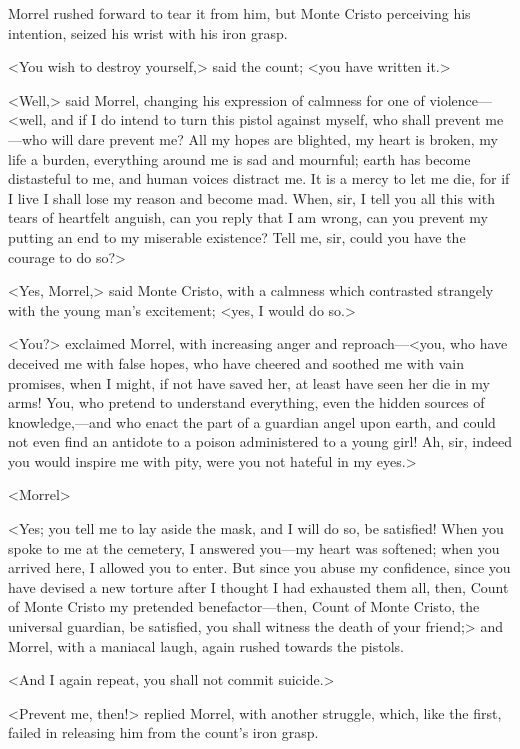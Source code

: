  Morrel rushed forward to tear it from him, but Monte Cristo perceiving his intention, seized his wrist with his iron grasp. 

 <You wish to destroy yourself,> said the count; <you have written it.> 

 <Well,> said Morrel, changing his expression of calmness for one of violence—<well, and if I do intend to turn this pistol against myself, who shall prevent me—who will dare prevent me? All my hopes are blighted, my heart is broken, my life a burden, everything around me is sad and mournful; earth has become distasteful to me, and human voices distract me. It is a mercy to let me die, for if I live I shall lose my reason and become mad. When, sir, I tell you all this with tears of heartfelt anguish, can you reply that I am wrong, can you prevent my putting an end to my miserable existence? Tell me, sir, could you have the courage to do so?> 

 <Yes, Morrel,> said Monte Cristo, with a calmness which contrasted strangely with the young man's excitement; <yes, I would do so.> 

 <You?> exclaimed Morrel, with increasing anger and reproach—<you, who have deceived me with false hopes, who have cheered and soothed me with vain promises, when I might, if not have saved her, at least have seen her die in my arms! You, who pretend to understand everything, even the hidden sources of knowledge,—and who enact the part of a guardian angel upon earth, and could not even find an antidote to a poison administered to a young girl! Ah, sir, indeed you would inspire me with pity, were you not hateful in my eyes.> 

 <Morrel\longdash> 

 <Yes; you tell me to lay aside the mask, and I will do so, be satisfied! When you spoke to me at the cemetery, I answered you—my heart was softened; when you arrived here, I allowed you to enter. But since you abuse my confidence, since you have devised a new torture after I thought I had exhausted them all, then, Count of Monte Cristo my pretended benefactor—then, Count of Monte Cristo, the universal guardian, be satisfied, you shall witness the death of your friend;> and Morrel, with a maniacal laugh, again rushed towards the pistols. 

 <And I again repeat, you shall not commit suicide.> 

 <Prevent me, then!> replied Morrel, with another struggle, which, like the first, failed in releasing him from the count's iron grasp. 

